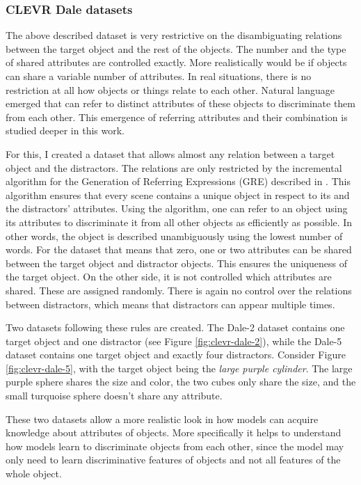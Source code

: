 \subsubsection*{CLEVR Dale datasets}
The above described dataset is very restrictive on the disambiguating relations between the target object and the rest of the objects.
The number and the type of shared attributes are controlled exactly.
More realistically would be if objects can share a variable number of attributes.
In real situations, there is no restriction at all how objects or things relate to each other.
Natural language emerged that can refer to distinct attributes of these objects to discriminate them from each other.
This emergence of referring attributes and their combination is studied deeper in this work.

For this, I created a dataset that allows almost any relation between a target object and the distractors.
The relations are only restricted by the incremental algorithm for the Generation of Referring Expressions (GRE) described in \citet{Dale1995}.
This algorithm ensures that every scene contains a unique object in respect to its and the distractors' attributes.
Using the algorithm, one can refer to an object using its attributes to discriminate it from all other objects as efficiently as possible.
In other words, the object is described unambiguously using the lowest number of words.
For the dataset that means that zero, one or two attributes can be shared between the target object and distractor objects.
This ensures the uniqueness of the target object.
On the other side, it is not controlled which attributes are shared.
These are assigned randomly.
There is again no control over the relations between distractors, which means that distractors can appear multiple times.

Two datasets following these rules are created.
The Dale-2 dataset contains one target object and one distractor (see Figure \ref{fig:clevr-dale-2}), while the Dale-5 dataset contains one target object and exactly four distractors.
Consider Figure \ref{fig:clevr-dale-5}, with the target object being the \emph{large purple cylinder}. The large purple sphere shares the size and color, the two cubes only share the size, and the small turquoise sphere doesn't share any attribute.

These two datasets allow a more realistic look in how models can acquire knowledge about attributes of objects.
More specifically it helps to understand how models learn to discriminate objects from each other, since the model may only need to learn discriminative features of objects and not all features of the whole object.

